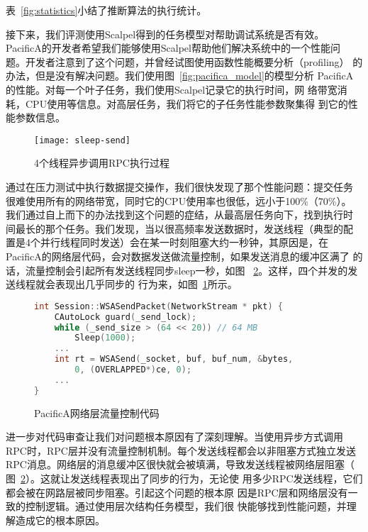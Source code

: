 表~\ref{fig:statistics}小结了推断算法的执行统计。

接下来，我们评测使用Scalpel得到的任务模型对帮助调试系统是否有效。
PacificA的开发者希望我们能够使用Scalpel帮助他们解决系统中的一个性能问
题。开发者注意到了这个问题，并曾经试图使用函数性能概要分析（profiling）
的办法，但是没有解决问题。我们使用图~\ref{fig:pacifica_model}的模型分析
PacificA的性能。对每一个叶子任务，我们使用Scalpel记录它的执行时间，网
络带宽消耗，CPU使用等信息。对高层任务，我们将它的子任务性能参数聚集得
到它的性能参数信息。

\begin{figure}
  \centering
  \begin{minipage}{0.8\linewidth}
    \centering
    \texttt{[image: sleep-send]}
    \caption{4个线程异步调用RPC执行过程}
    \label{fig:sleep-send}
  \end{minipage}
\end{figure}


通过在压力测试中执行数据提交操作，我们很快发现了那个性能问题：提交任务
很难使用所有的网络带宽，同时它的CPU使用率也很低，远小于100\%（70\%）。
我们通过自上而下的办法找到这个问题的症结，从最高层任务向下，找到执行时
间最长的那个任务。我们发现，当以很高频率发送数据时，发送线程（典型的配
置是4个并行线程同时发送）会在某一时刻阻塞大约一秒钟，其原因是，在
PacificA的网络层代码，会对数据发送做流量控制，如果发送消息的缓冲区满了
的话，流量控制会引起所有发送线程同步sleep一秒，如图~
\ref{fig:flow_control_code}。这样，四个并发的发送线程就会表现出几乎同步的
行为来，如图~\ref{fig:sleep-send}所示。

\begin{figure}
\centering
\begin{lstlisting}[language=C++]
int Session::WSASendPacket(NetworkStream * pkt) {    
    CAutoLock guard(_send_lock);
    while (_send_size > (64 << 20)) // 64 MB
        Sleep(1000);
    ...
    int rt = WSASend(_socket, buf, buf_num, &bytes,
        0, (OVERLAPPED*)ce, 0);
    ...
}
\end{lstlisting}
\caption{PacificA网络层流量控制代码}
\label{fig:flow_control_code}
\end{figure}


进一步对代码审查让我们对问题根本原因有了深刻理解。当使用异步方式调用
RPC时，RPC层并没有流量控制机制。每个发送线程都会以非阻塞方式独立发送
RPC消息。网络层的消息缓冲区很快就会被填满，导致发送线程被网络层阻塞（
图~\ref{fig:flow_control_code}）。这就让发送线程表现出了同步的行为，无论使
用多少RPC发送线程，它们都会被在网路层被同步阻塞。引起这个问题的根本原
因是RPC层和网络层没有一致的控制逻辑。通过使用层次结构任务模型，我们很
快能够找到性能问题，并理解造成它的根本原因。

